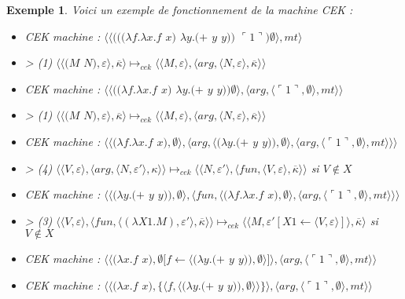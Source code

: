\documentclass[10pt,a4paper]{report}
\newtheorem{ex}{Exemple}
\begin{document}
	\begin{ex}\label{CEK} Voici un exemple de fonctionnement de la machine CEK :
		\medbreak
		
		\begin{itemize}
			\item[] CEK machine : $\langle\langle(((\lambda f.\lambda x.f$ $x)$ $\lambda y.(+$ $y$ $y))$ $\ulcorner 1\urcorner)\emptyset\rangle,mt\rangle$
			\item[] > (1) $\langle\langle(M$ $N),\varepsilon\rangle,\overline{\kappa}\rangle \longmapsto_{cek} \langle \langle M,\varepsilon\rangle,\langle arg,\langle N,\varepsilon\rangle,\overline{\kappa}\rangle\rangle$
			\item[] CEK machine : $\langle\langle((\lambda f.\lambda x.f$ $x)$ $\lambda y.(+$ $y$ $y))\emptyset\rangle,\langle arg,\langle\ulcorner 1\urcorner,\emptyset\rangle,mt\rangle\rangle$
			\item[] > (1) $\langle\langle(M$ $N),\varepsilon\rangle,\overline{\kappa}\rangle \longmapsto_{cek} \langle \langle M,\varepsilon\rangle,\langle arg,\langle N,\varepsilon\rangle,\overline{\kappa}\rangle\rangle$
			\item[] CEK machine : $\langle\langle(\lambda f.\lambda x.f$ $x),\emptyset\rangle,\langle arg,\langle(\lambda y.(+$ $y$ $y)),\emptyset\rangle,\langle arg,\langle\ulcorner 1\urcorner,\emptyset\rangle,mt\rangle\rangle\rangle$
			\item[] > (4) $\langle \langle V,\varepsilon\rangle,\langle arg,\langle N,\varepsilon'\rangle,\kappa\rangle\rangle \longmapsto_{cek} \langle \langle N,\varepsilon'\rangle,\langle fun,\langle V,\varepsilon\rangle,\overline{\kappa}\rangle\rangle$ si $V \notin X$
			\item[] CEK machine : $\langle\langle(\lambda y.(+$ $y$ $y)),\emptyset\rangle,\langle fun,\langle(\lambda f.\lambda x.f$ $x),\emptyset\rangle,\langle arg,\langle\ulcorner 1\urcorner,\emptyset\rangle,mt\rangle\rangle\rangle$
			\item[] > (3) $\langle\langle V,\varepsilon\rangle,\langle fun,\langle (\lambda X1.M),\varepsilon'\rangle,\overline{\kappa} \rangle \rangle \longmapsto_{cek} \langle \langle M,\varepsilon'[X1 \leftarrow \langle V,\varepsilon\rangle]\rangle,\overline{\kappa}\rangle$ si $V \notin X$
			\item[] CEK machine : $\langle\langle(\lambda x.f$ $x),\emptyset[f \leftarrow \langle(\lambda y.(+$ $y$ $y)),\emptyset\rangle]\rangle,\langle arg,\langle\ulcorner 1\urcorner,\emptyset\rangle,mt\rangle\rangle$
			\item[] CEK machine : $\langle\langle(\lambda x.f$ $x),\{\langle f,\langle(\lambda y.(+$ $y$ $y)),\emptyset\rangle\rangle\}\rangle,\langle arg,\langle\ulcorner 1\urcorner,\emptyset\rangle,mt\rangle\rangle$

\end{itemize}
\end{ex}
\end{document}
